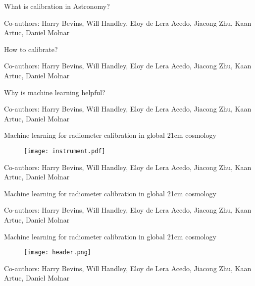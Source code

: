 \documentclass{beamer}
\begin{document}
\begin{frame}{\small{What is calibration in Astronomy?}}
\begin{figure}[h]
  \centering
  
\end{figure}
    \tiny{Co-authors: Harry Bevins, Will Handley, Eloy de Lera Acedo, Jiacong Zhu, Kaan Artuc, Daniel Molnar}
  \end{frame}


\begin{frame}{\small{How to calibrate?}}
\begin{figure}[h]
  \centering
  
\end{figure}
    \tiny{Co-authors: Harry Bevins, Will Handley, Eloy de Lera Acedo, Jiacong Zhu, Kaan Artuc, Daniel Molnar}
  \end{frame}


\begin{frame}{\small{Why is machine learning helpful?}}
\begin{figure}[h]
  \centering
  
\end{figure}
    \tiny{Co-authors: Harry Bevins, Will Handley, Eloy de Lera Acedo, Jiacong Zhu, Kaan Artuc, Daniel Molnar}
  \end{frame}

\begin{frame}{\small{Machine learning for radiometer calibration in global 21cm cosmology}}
  \begin{figure}
    \centering
    \texttt{[image: instrument.pdf]}
  \end{figure}
    \vspace{0.3cm}
    \tiny{Co-authors: Harry Bevins, Will Handley, Eloy de Lera Acedo, Jiacong Zhu, Kaan Artuc, Daniel Molnar}
  \end{frame}

  \begin{frame}{\small{Machine learning for radiometer calibration in global 21cm cosmology}}
    \begin{figure}
    \centering
    
  \end{figure}

    \tiny{Co-authors: Harry Bevins, Will Handley, Eloy de Lera Acedo, Jiacong Zhu, Kaan Artuc, Daniel Molnar}

  \end{frame}

  \begin{frame}{\small{Machine learning for radiometer calibration in global 21cm cosmology}}
    \begin{figure}
      \centering
      
    \end{figure}
    \begin{figure}
      \centering
      \texttt{[image: header.png]}
    \end{figure}
    \vspace{0.3cm}
    \tiny{Co-authors: Harry Bevins, Will Handley, Eloy de Lera Acedo, Jiacong Zhu, Kaan Artuc, Daniel Molnar}
  \end{frame}
\end{document}
